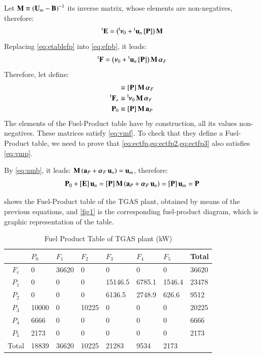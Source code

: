 \documentclass{ecos2018}
\begin{document}
Let ${\mathbf{M} \equiv \left(\mathbf{U}_m - \mathbf{B}\right)^{-1}}$ its inverse matrix, whose elements are non-negatives, therefore:
\begin{equation}
\label{eq:etablefp}
\prescript{\smash{\mathrm{t}}}{}{\mathbf{E}}=\left(\prescript{\smash{\mathsf{t}}}{}{\mskip-1mu}\bm{\nu}_0 +\prescript{\smash{\mathrm{t}}}{}{\mathbf{u}}_n\, [\mathbf{P}]\right)\mathbf{M}
\end{equation}
Replacing \cref{eq:etablefp} into \cref{eq:efpb}, it leads:
\begin{equation}
\prescript{\smash{\mathrm{t}}}{}{\mathbf{F}}=\left(\bm{\nu}_0 +\prescript{\smash{\mathrm{t}}}{}{\mathbf{u}}_n\, [\mathbf{P}]\right)\mathbf{M}\,\bm{\alpha}_F
\end{equation}
Therefore, let define:
\begin{align}
[\vm{E}] &\equiv [\vm{P}]\, \vm{M}\,\bm{\alpha}_F \label{eq:ectfp}\\
\tvm{F}_e &\equiv \tm\bm{\nu}_0\,\vm{M}\,\bm{\alpha}_F \label{eq:ectfp2}\\
\vm{P}_0 &\equiv [\vm{P}]\, \vm{M}\,\vm{a}_P \label{eq:ectfp3}
\end{align}
The elements of the Fuel-Product table have by construction, all its values non-negatives.
These matrices satisfy \cref{eq:vmf}. To check that they define a Fuel-Product table, we need to prove that \cref{eq:ectfp,eq:ectfp2,eq:ectfp3} also satisfies \cref{eq:vmp}.

By \cref{eq:umb}, it leads: $\mathbf{M}\left(\mathbf{a}_P+\bm{\alpha}_F\,\mathbf{u}_n\right)=\mathbf{u}_m$, therefore:
\begin{equation}
\mathbf{P}_0+\left[ \textbf{E} \right]\mathbf{u}_n=\left[ \textbf{P} \right]\mathbf{M}\left(\mathbf{a}_P+\bm{\alpha}_F\,\mathbf{u}_n\right)=\left[ \textbf{P} \right]\mathbf{u}_m=\mathbf{P}
\end{equation}

 shows the Fuel-Product table of the TGAS plant, obtained by means of the previous equations, and \cref{fig1} is the corresponding fuel-product diagram, which is graphic representation of the table.
\begin{table}[htbp]
	\caption{Fuel Product Table of TGAS plant (kW)}
	\begin{tabularx}{0.85\textwidth}{cZZZZZZZ}
		\addlinespace
		\toprule
		& $P_0$    & $F_1$    & $F_2$   & $F_3$    & $F_4$    & $F_5$    & Total \\
		\midrule
		$F_e$    & 0     & 36620 & 0     & 0       & 0      & 0      & 36620 \\
		\midrule
		$P_1$    & 0     & 0     & 0     & 15146.5 & 6785.1 & 1546.4 & 23478 \\
		$P_2$    & 0     & 0     & 0     & 6136.5  & 2748.9 & 626.6  & 9512 \\
		$P_3$    & 10000 & 0     & 10225 & 0       & 0      & 0      & 20225 \\
		$P_4$    & 6666  & 0     & 0     & 0       & 0      & 0      & 6666 \\
		$P_5$    & 2173  & 0     & 0     & 0       & 0      & 0      & 2173 \\
		\midrule
		Total & 18839 & 36620 & 10225 & 21283 & 9534  & 2173  &  \\
		\bottomrule
	\end{tabularx}
	\label{tab2}
\end{table}
\end{document}
